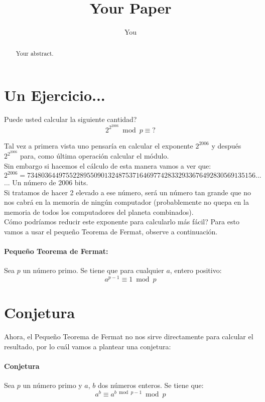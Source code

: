 \documentclass[12pt]{article}
\title{Your Paper}
\author{You}
\begin{document}
\maketitle

\begin{abstract}
Your abstract.
\end{abstract}

\section{Un Ejercicio...}

Puede usted calcular la siguiente cantidad?
$$2^{2^{2006}} \bmod{p} \equiv ?$$

Tal vez a primera vista uno pensaría en calcular el exponente $2^{2006}$ 
y después $2^{2^{2006}}$ para, como última operación calcular el módulo.\\

Sin embargo si hacemos el cálculo de esta manera vamos a ver que:
$$ 2 ^{2006} = 73480364497552289550901324875371646977428332933676492830569135156...$$... Un número de 2006 bits.\\
Si tratamos de hacer 2 elevado a ese número, será un número tan grande que no
nos cabrá en la memoria de ningún computador (probablemente no quepa en la
memoria de todos los computadores del planeta combinados).\\
Cómo podríamos reducir este exponente para calcularlo más fácil? Para esto vamos
a usar el pequeño Teorema de Fermat, observe a continuación.\\
\paragraph{Pequeño Teorema de Fermat:}
	Sea $p$ un número primo. Se tiene que para cualquier $a$, entero positivo:
    $$a^{p-1} \equiv 1 \bmod{p}$$

\section{Conjetura}
Ahora, el Pequeño Teorema de Fermat no nos sirve directamente para calcular el
resultado, por lo cuál vamos a plantear una conjetura:

\paragraph{Conjetura} Sea $p$ un número primo y $a$, $b$ dos números enteros. Se
tiene que:
$$a^{b} \equiv a^{b \bmod{p-1}} \bmod{p}$$
\end{document}
